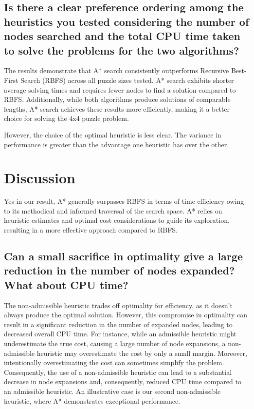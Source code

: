 \documentclass{article}
\begin{document}
 

\subsection{  Is there a clear preference ordering among the heuristics you tested considering the number of nodes searched and the total CPU time taken to solve the problems for the two algorithms?}
 
The results demonstrate that A* search consistently outperforms Recursive Best-First Search (RBFS) across all puzzle sizes tested. A* search exhibits shorter average solving times and requires fewer nodes to find a solution compared to RBFS. Additionally, while both algorithms produce solutions of comparable lengths, A* search achieves these results more efficiently, making it a better choice for solving the 4x4 puzzle problem.

However, the choice of the optimal heuristic is less clear. The variance in performance is greater than the advantage one heuristic has over the other. 

\section{Discussion}

{Yes in our result, A* generally surpasses RBFS in terms of time efficiency owing to its methodical and informed traversal of the search space. A* relies on heuristic estimates and optimal cost considerations to guide its exploration, resulting in a more effective approach compared to RBFS.}

\subsection{  Can a small sacrifice in optimality give a large reduction in the number of nodes expanded? What about CPU time?}

{The non-admissible heuristic trades off optimality for efficiency, as it doesn't always produce the optimal solution. However, this compromise in optimality can result in a significant reduction in the number of expanded nodes, leading to decreased overall CPU time. For instance, while an admissible heuristic might underestimate the true cost, causing a large number of node expansions, a non-admissible heuristic may overestimate the cost by only a small margin. Moreover, intentionally overestimating the cost can sometimes simplify the problem. Consequently, the use of a non-admissible heuristic can lead to a substantial decrease in node expansions and, consequently, reduced CPU time compared to an admissible heuristic. An illustrative case is our second non-admissible heuristic, where A* demonstrates exceptional performance.}
\end{document}
